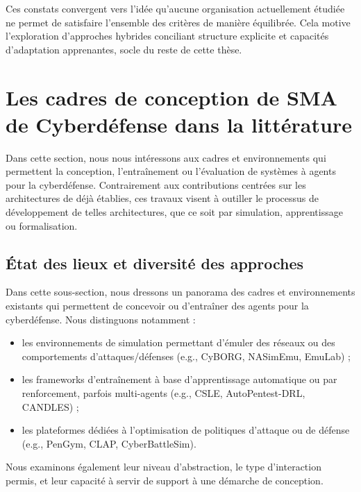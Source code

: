 Ces constats convergent vers l’idée qu’aucune organisation actuellement étudiée ne permet de satisfaire l’ensemble des critères de manière équilibrée. Cela motive l’exploration d’approches hybrides conciliant structure explicite et capacités d’adaptation apprenantes, socle du reste de cette thèse.

\section{Les cadres de conception de SMA de Cyberdéfense dans la littérature}\label{sec:sma-cyberdefense-conception}

Dans cette section, nous nous intéressons aux cadres et environnements qui permettent la conception, l'entraînement ou l'évaluation de systèmes à agents pour la cyberdéfense. Contrairement aux contributions centrées sur les architectures de  déjà établies, ces travaux visent à outiller le processus de développement de telles architectures, que ce soit par simulation, apprentissage ou formalisation.

\subsection{État des lieux et diversité des approches}

Dans cette sous-section, nous dressons un panorama des cadres et environnements existants qui permettent de concevoir ou d'entraîner des agents pour la cyberdéfense. Nous distinguons notamment :
\begin{itemize}
  \item les environnements de simulation permettant d’émuler des réseaux ou des comportements d’attaques/défenses (e.g., CyBORG, NASimEmu, EmuLab) ;
  \item les frameworks d’entraînement à base d’apprentissage automatique ou par renforcement, parfois multi-agents (e.g., CSLE, \allowbreak AutoPentest-DRL, CANDLES) ;
  \item les plateformes dédiées à l’optimisation de politiques d’attaque ou de défense (e.g., PenGym, CLAP, CyberBattleSim).
\end{itemize}

Nous examinons également leur niveau d’abstraction, le type d’interaction permis, et leur capacité à servir de support à une démarche de conception.

\medskip

